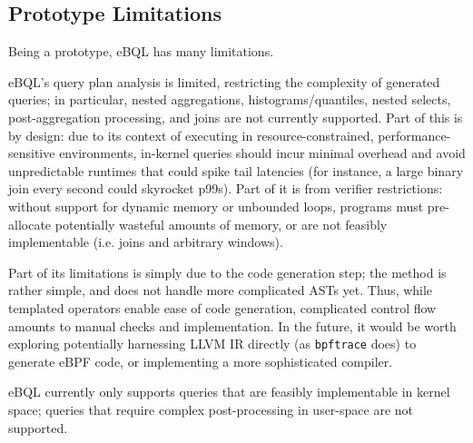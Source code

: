 \subsection{Prototype Limitations}

Being a prototype, eBQL has many limitations.

eBQL's query plan analysis is limited, restricting the complexity of generated queries; in
particular, nested aggregations, histograms/quantiles, nested selects, post-aggregation processing,
and joins are not currently supported. Part of this is by design: due to its context of executing in
resource-constrained, performance-sensitive environments, in-kernel queries should incur minimal
overhead and avoid unpredictable runtimes that could spike tail latencies (for instance, a large
binary join every second could skyrocket p99s). Part of it is from verifier restrictions: without
support for dynamic memory or unbounded loops, programs must pre-allocate potentially wasteful
amounts of memory, or are not feasibly implementable (i.e. joins and arbitrary windows).

Part of its limitations is simply due to the code generation step; the method is rather simple,
and does not handle more complicated ASTs yet. Thus, while templated operators enable ease of code
generation, complicated control flow amounts to manual checks and implementation. In the future, it
would be worth exploring potentially harnessing LLVM IR directly (as \texttt{bpftrace} does) to
generate eBPF code, or implementing a more sophisticated compiler.

eBQL currently only supports queries that are feasibly implementable in kernel space; queries that
require complex post-processing in user-space are not supported.


